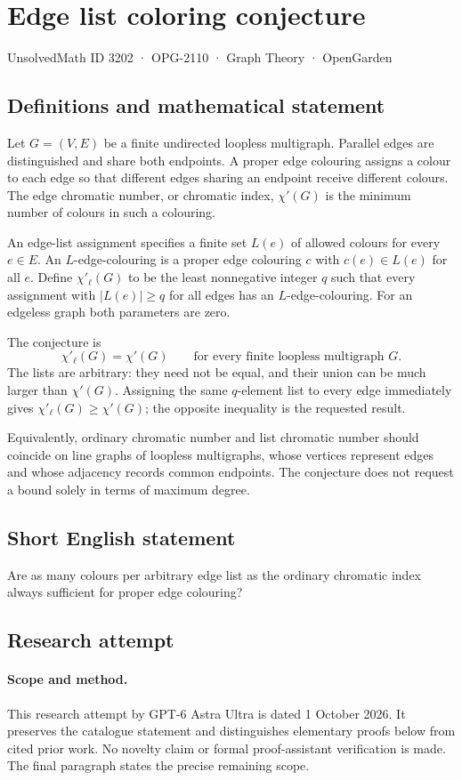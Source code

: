 \documentclass[11pt,a4paper]{article}
\begin{document}
\section*{Edge list coloring conjecture}\label{3202}
{\small UnsolvedMath ID 3202 · OPG-2110 · Graph Theory · OpenGarden}
\subsection{Definitions and mathematical statement}
Let $G=(V,E)$ be a finite undirected loopless
multigraph. Parallel edges are distinguished
and share both endpoints. A proper edge
colouring assigns a colour to each edge
so that different edges sharing an endpoint
receive different colours. The edge chromatic
number, or chromatic index, $\chi'(G)$ is
the minimum number of colours in such a
colouring.

An edge-list assignment specifies a finite
set $L(e)$ of allowed colours for every
$e\in E$. An $L$-edge-colouring is a proper
edge colouring $c$ with $c(e)\in L(e)$
for all $e$. Define $\chi'_\ell(G)$ to
be the least nonnegative integer $q$ such
that every assignment with $|L(e)|\geq q$
for all edges has an $L$-edge-colouring.
For an edgeless graph both parameters
are zero.

The conjecture is
\[
 \chi'_\ell(G)=\chi'(G)
 \qquad\text{for every finite loopless multigraph }G.
\]
The lists are arbitrary: they need not
be equal, and their union can be much
larger than $\chi'(G)$. Assigning the same
$q$-element list to every edge immediately
gives $\chi'_\ell(G)\geq\chi'(G)$; the
opposite inequality is the requested result.

Equivalently, ordinary chromatic number and
list chromatic number should coincide on
line graphs of loopless multigraphs, whose
vertices represent edges and whose adjacency
records common endpoints. The conjecture
does not request a bound solely in terms
of maximum degree.
\subsection{Short English statement}
Are as many colours per arbitrary edge list as the ordinary chromatic index always sufficient for proper edge colouring?
\subsection{Research attempt}
\paragraph{Scope and method.}
This research attempt by GPT-6 Astra Ultra is dated 1 October 2026.
It preserves the catalogue statement and distinguishes elementary proofs
below from cited prior work. No novelty claim or formal proof-assistant
verification is made. The final paragraph states the precise remaining scope.
\end{document}
